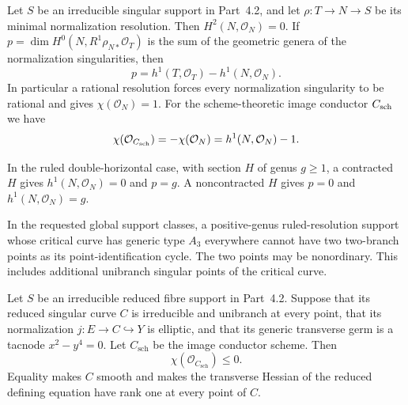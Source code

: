 
\begin{proposition}[P4.33]\hypertarget{tag-02X6}{}\label{night:P4.33}\label{stmt:P4.33}


Let $S$ be an irreducible singular support in Part~4.2, and let
$\rho:T\to N\to S$ be its minimal normalization resolution.
Then $H^2(N,\mathcal O_N)=0$. If
$p=\dim H^0(N,R^1\rho_{N*}\mathcal O_T)$ is the sum of the
geometric genera of the normalization singularities, then
\[
 p=h^1(T,\mathcal O_T)-h^1(N,\mathcal O_N).
\]
In particular a rational resolution forces every normalization
singularity to be rational and gives $\chi(\mathcal O_N)=1$.
For the scheme-theoretic image conductor $C_{\rm sch}$ we have
\[
 \chi(\mathcal O_{C_{\rm sch}})
   =-\chi(\mathcal O_N)=h^1(N,\mathcal O_N)-1.
\]

In the ruled double-horizontal case, with section $H$ of genus
$g\ge1$, a contracted $H$ gives $h^1(N,\mathcal O_N)=0$ and
$p=g$. A noncontracted $H$ gives $p=0$ and
$h^1(N,\mathcal O_N)=g$.
\end{proposition}

\begin{proposition}[P4.42]\hypertarget{tag-02XG}{}\label{night:P4.42}\label{stmt:P4.42}


In the requested global support classes, a positive-genus
ruled-resolution support whose critical curve has generic
type $A_3$ everywhere cannot have two two-branch points as
its point-identification cycle. The two points may be
nonordinary. This includes additional
unibranch singular points of the critical curve.
\end{proposition}

\begin{proposition}[P4R.10]\hypertarget{tag-02Y3}{}\label{night:P4R.10}\label{stmt:P4R.10}


Let $S$ be an irreducible reduced fibre support in Part~4.2.
Suppose that its reduced singular curve $C$ is irreducible and
unibranch at every point, that its normalization $j:E\to C\hookrightarrow Y$
is elliptic, and that its generic transverse germ is a tacnode
$x^2-y^4=0$. Let $C_{\mathrm{sch}}$ be the image conductor scheme.
Then
\[
 \chi(\mathcal O_{C_{\mathrm{sch}}})\leq0.
\]
Equality makes $C$ smooth and makes the transverse Hessian of
the reduced defining equation have rank one at every point of $C$.
\end{proposition}

